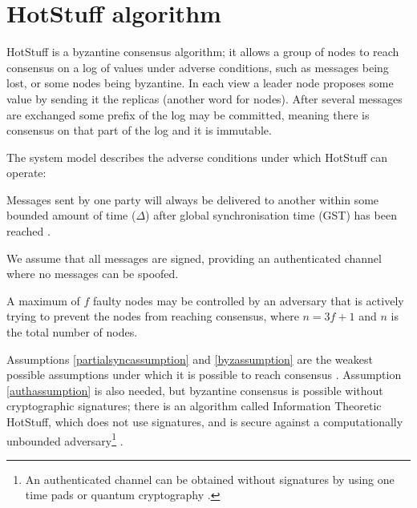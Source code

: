 \section{HotStuff algorithm} \label{hotstufftheory}
HotStuff is a byzantine consensus algorithm; it allows a group of nodes to reach consensus on a log of values under adverse conditions, such as messages being lost, or some nodes being byzantine. In each view a leader node proposes some value by sending it the replicas (another word for nodes). After several messages are exchanged some prefix of the log may be committed, meaning there is consensus on that part of the log and it is immutable.

The system model describes the adverse conditions under which HotStuff can operate:
\begin{assumption} \label{partialsyncassumption}
	Messages sent by one party will always be delivered to another within some bounded amount of time ($\Delta$) after global synchronisation time (GST) has been reached \cite{dworkConsensusPresencePartial1988}.
\end{assumption}

\begin{assumption}[Authenticated] \label{authassumption}
	We assume that all messages are signed, providing an authenticated channel where no messages can be spoofed.
\end{assumption}

\begin{assumption}[Byzantine] \label{byzassumption}
	A maximum of $f$ faulty nodes may be controlled by an adversary that is actively trying to prevent the nodes from reaching consensus, where $n = 3f + 1$ and $n$ is the total number of nodes.
\end{assumption}

Assumptions \ref{partialsyncassumption} and \ref{byzassumption} are the weakest possible assumptions under which it is possible to reach consensus \cite{peaseReachingAgreementPresence1980,fischerEasyImpossibilityProofs1986}. Assumption \ref{authassumption} is also needed, but byzantine consensus is possible without cryptographic signatures; there is an algorithm called Information Theoretic HotStuff, which does not use signatures, and is secure against a computationally unbounded adversary\footnote{An authenticated channel can be obtained without signatures by using one time pads or quantum cryptography \cite{bennettExperimentalQuantumCryptography1992}.} \cite{abrahamInformationTheoreticHotStuff2020}.

